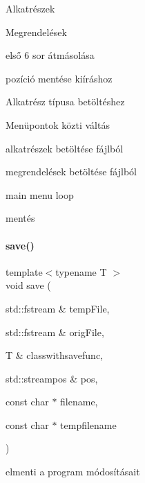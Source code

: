 Alkatrészek

Megrendelések

első 6 sor átmásolása

pozíció mentése kiíráshoz

Alkatrész típusa betöltéshez

Menüpontok közti váltás

alkatrészek betöltése fájlból

megrendelések betöltése fájlból

main menu loop

mentés \mbox{\label{main_8cpp_a5f7b8c9ea0d63088ae9f9454d89b392b}} 
\paragraph{\texorpdfstring{save()}{save()}}
{\footnotesize\ttfamily template$<$typename T $>$ \\
void save (\begin{DoxyParamCaption}\item[{std\+::fstream \&}]{temp\+File,  }\item[{std\+::fstream \&}]{orig\+File,  }\item[{T \&}]{classwithsavefunc,  }\item[{std\+::streampos \&}]{pos,  }\item[{const char $\ast$}]{filename,  }\item[{const char $\ast$}]{tempfilename }\end{DoxyParamCaption})}



elmenti a program módosításait 

